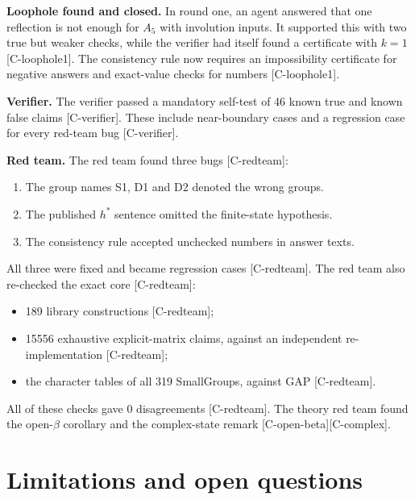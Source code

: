 \documentclass[10pt,twocolumn,a4paper]{article}
\providecommand{\tightlist}{\setlength{\itemsep}{0pt}\setlength{\parskip}{0pt}}
\begin{document}
\textbf{Loophole found and closed.} In round one, an agent answered that one reflection is not enough for \(A_5\) with involution inputs. It supported this with two true but weaker checks, while the verifier had itself found a certificate with \(k = 1\) {[}C-loophole1{]}. The consistency rule now requires an impossibility certificate for negative answers and exact-value checks for numbers {[}C-loophole1{]}.

\textbf{Verifier.} The verifier passed a mandatory self-test of 46 known true and known false claims {[}C-verifier{]}. These include near-boundary cases and a regression case for every red-team bug {[}C-verifier{]}.

\textbf{Red team.} The red team found three bugs {[}C-redteam{]}:

\begin{enumerate}
\def\labelenumi{\arabic{enumi}.}
\tightlist
\item
  The group names S1, D1 and D2 denoted the wrong groups.
\item
  The published \(h^*\) sentence omitted the finite-state hypothesis.
\item
  The consistency rule accepted unchecked numbers in answer texts.
\end{enumerate}

All three were fixed and became regression cases {[}C-redteam{]}. The red team also re-checked the exact core {[}C-redteam{]}:

\begin{itemize}
\tightlist
\item
  189 library constructions {[}C-redteam{]};
\item
  15556 exhaustive explicit-matrix claims, against an independent re-implementation {[}C-redteam{]};
\item
  the character tables of all 319 SmallGroups, against GAP {[}C-redteam{]}.
\end{itemize}

All of these checks gave 0 disagreements {[}C-redteam{]}. The theory red team found the open-\(\beta\) corollary and the complex-state remark {[}C-open-beta{]}{[}C-complex{]}.

\section{Limitations and open questions}\label{limitations-and-open-questions}
\end{document}
